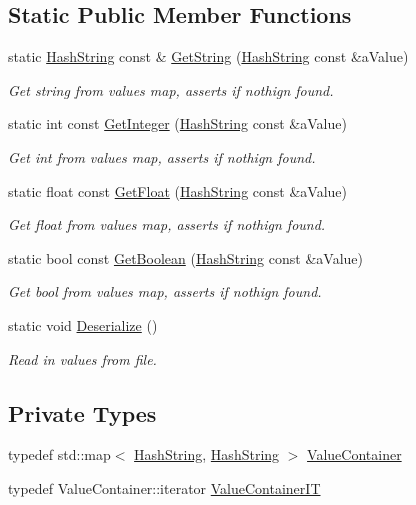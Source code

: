\subsection*{Static Public Member Functions}
\begin{DoxyCompactItemize}
\item 
static \hyperlink{classHashString}{Hash\+String} const \& \hyperlink{classConstants_ad7c0dc070ec520b5342cd1c03a683ab2}{Get\+String} (\hyperlink{classHashString}{Hash\+String} const \&a\+Value)
\begin{DoxyCompactList}\small\item\em Get string from values map, asserts if nothign found. \end{DoxyCompactList}\item 
static int const \hyperlink{classConstants_a715f6423feff0f8ec1d29dfcd0f4a1d5}{Get\+Integer} (\hyperlink{classHashString}{Hash\+String} const \&a\+Value)
\begin{DoxyCompactList}\small\item\em Get int from values map, asserts if nothign found. \end{DoxyCompactList}\item 
static float const \hyperlink{classConstants_a7f6c3d9debd16948336bcd8ffdf8317e}{Get\+Float} (\hyperlink{classHashString}{Hash\+String} const \&a\+Value)
\begin{DoxyCompactList}\small\item\em Get float from values map, asserts if nothign found. \end{DoxyCompactList}\item 
static bool const \hyperlink{classConstants_a17cb93f9da17f0dd92119cc569c03628}{Get\+Boolean} (\hyperlink{classHashString}{Hash\+String} const \&a\+Value)
\begin{DoxyCompactList}\small\item\em Get bool from values map, asserts if nothign found. \end{DoxyCompactList}\item 
static void \hyperlink{classConstants_a64aa942f3bab48c5678cd851ac684c82}{Deserialize} ()
\begin{DoxyCompactList}\small\item\em Read in values from file. \end{DoxyCompactList}\end{DoxyCompactItemize}
\subsection*{Private Types}
\begin{DoxyCompactItemize}
\item 
typedef std\+::map$<$ \hyperlink{classHashString}{Hash\+String}, \hyperlink{classHashString}{Hash\+String} $>$ \hyperlink{classConstants_a0401951e4652f084ecd5ea6bf1a252e5}{Value\+Container}
\item 
typedef Value\+Container\+::iterator \hyperlink{classConstants_acdb756c711b1c53b6d05f335a87a995c}{Value\+Container\+IT}
\end{DoxyCompactItemize}
